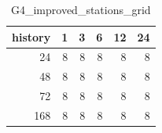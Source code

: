 \begin{table}
\caption{G4_improved_stations_grid}
\label{tab:G4_improved_stations_grid}
\begin{tabular}{rrrrrr}
\toprule
history & 1 & 3 & 6 & 12 & 24 \\
\midrule
24 & 8 & 8 & 8 & 8 & 8 \\
48 & 8 & 8 & 8 & 8 & 8 \\
72 & 8 & 8 & 8 & 8 & 8 \\
168 & 8 & 8 & 8 & 8 & 8 \\
\bottomrule
\end{tabular}
\end{table}
